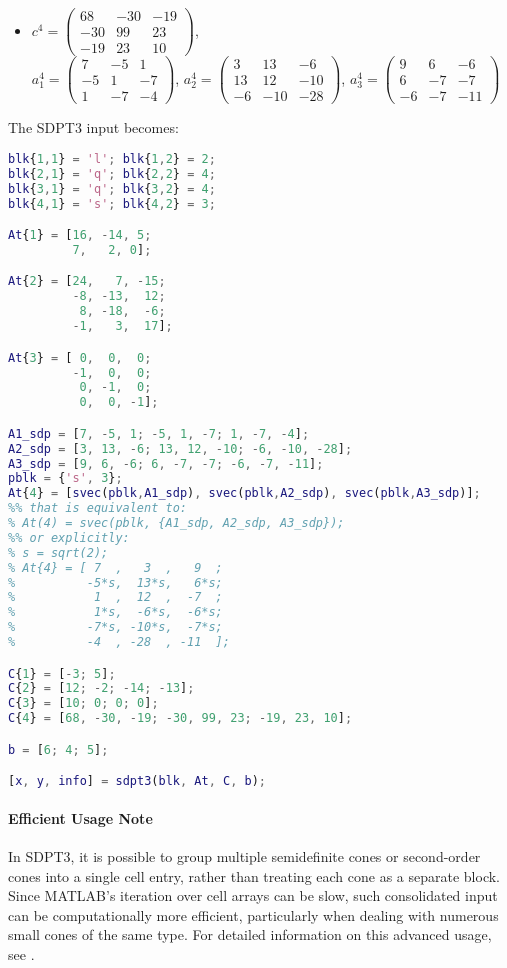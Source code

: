 \begin{example}
\begin{itemize}
    \item $c^4 = \begin{pmatrix} 68 & -30 & -19 \\ -30 & 99 & 23 \\ -19 & 23 & 10 \end{pmatrix}$, \\
    $a^4_1 = \begin{pmatrix} 7 & -5 & 1 \\ -5 & 1 & -7 \\ 1 & -7 & -4 \end{pmatrix}$, 
    $a^4_2 = \begin{pmatrix} 3 & 13 & -6 \\ 13 & 12 & -10 \\ -6 & -10 & -28 \end{pmatrix}$, 
    $a^4_3 = \begin{pmatrix} 9 & 6 & -6 \\ 6 & -7 & -7 \\ -6 & -7 & -11 \end{pmatrix}$
\end{itemize}

The SDPT3 input becomes:
\begin{lstlisting}[language=Matlab]
blk{1,1} = 'l'; blk{1,2} = 2;
blk{2,1} = 'q'; blk{2,2} = 4;
blk{3,1} = 'q'; blk{3,2} = 4;
blk{4,1} = 's'; blk{4,2} = 3;

At{1} = [16, -14, 5;
         7,   2, 0];

At{2} = [24,   7, -15;
         -8, -13,  12;
          8, -18,  -6;
         -1,   3,  17];

At{3} = [ 0,  0,  0;
         -1,  0,  0;
          0, -1,  0;
          0,  0, -1];

A1_sdp = [7, -5, 1; -5, 1, -7; 1, -7, -4];
A2_sdp = [3, 13, -6; 13, 12, -10; -6, -10, -28];
A3_sdp = [9, 6, -6; 6, -7, -7; -6, -7, -11];
pblk = {'s', 3};
At{4} = [svec(pblk,A1_sdp), svec(pblk,A2_sdp), svec(pblk,A3_sdp)];
%% that is equivalent to:
% At(4) = svec(pblk, {A1_sdp, A2_sdp, A3_sdp});
%% or explicitly:
% s = sqrt(2);
% At{4} = [ 7  ,   3  ,   9  ;
%          -5*s,  13*s,   6*s;
%           1  ,  12  ,  -7  ;
%           1*s,  -6*s,  -6*s;
%          -7*s, -10*s,  -7*s;
%          -4  , -28  , -11  ];

C{1} = [-3; 5];
C{2} = [12; -2; -14; -13];
C{3} = [10; 0; 0; 0];
C{4} = [68, -30, -19; -30, 99, 23; -19, 23, 10];

b = [6; 4; 5];

[x, y, info] = sdpt3(blk, At, C, b);
\end{lstlisting}
\end{example}

\paragraph{Efficient Usage Note}
In SDPT3, it is possible to group multiple semidefinite cones or second-order cones into a single cell entry, rather than treating each cone as a separate block. 
Since MATLAB's iteration over cell arrays can be slow, such consolidated input can be computationally more efficient, particularly when dealing with numerous small cones of the same type. 
For detailed information on this advanced usage, see \cite{Toh2012}.